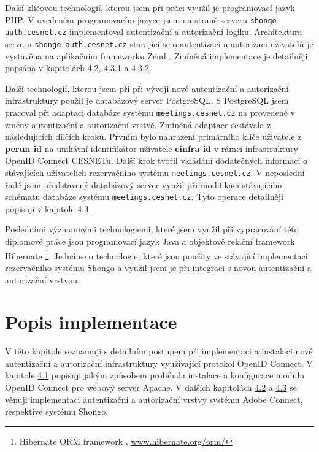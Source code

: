 \documentclass[
  printed, %
  twoside, %
  table,   %
  nolof,     %
  nolot,     %
]{fithesis3}
\begin{document}
\par
Další klíčovou technologií, kterou jsem při práci využil je programovací jazyk PHP. V uvedeném programovacím jazyce jsem na straně serveru \texttt{shongo-auth.cesnet.cz} implementoval autentizační a autorizační logiku. Architektura serveru \texttt{shongo-auth.cesnet.cz} starající se o autentizaci a autorizaci uživatelů je vystavěna na aplikačním frameworku Zend \cite{zend}. Zmíněná implementace je detailněji popsána v kapitolách \hyperref[ACImpl]{4.2}, \hyperref[ShongoImpl-authn]{4.3.1} a \hyperref[ShongoImpl-authr]{4.3.2}. 

\par

Další technologií, kterou jsem při při vývoji nové autentizační a autorizační infrastruktury použil je databázový server PostgreSQL. S PostgreSQL jsem pracoval při adaptaci databáze systému \texttt{meetings.cesnet.cz} na provedené v změny autentizační a autorizační vrstvě. Zmíněná adaptace sestávala z následujících dílčích kroků. Prvním bylo nahrazení primárního klíče uživatele z \textbf{perun id} na unikátní identifikátor uživatele  \textbf{einfra id} v rámci infrastruktury OpenID Connect CESNETu. Další krok tvořil vkládání dodatečných informací o stávajících uživatelích rezervačního systému \texttt{meetings.cesnet.cz}. V neposlední řadě jsem představený databázový server využil při modifikaci stávajícího schématu databáze systému \texttt{meetings.cesnet.cz}. Tyto operace detailněji popisuji v kapitole \hyperref[ShongoImpl]{4.3}. 
\par 
Posledními významnými technologiemi, které jsem využil při vypracování této diplomové práce jsou programovací jazyk Java a objektově relační framework Hibernate \footnote{Hibernate ORM framework , \url{www.hibernate.org/orm/}}. Jedná se o technologie, které jsou použity ve stávající implementaci rezervačního systému Shongo a využil jsem je při integraci s novou autentizační a autorizační vrstvou.  


\chapter{Popis implementace}
V této kapitole seznamuji s detailním postupem při implementaci a instalaci nové autentizační a autorizační infrastruktury využívající protokol OpenID Connect. V kapitole \hyperref[apacheConfig]{4.1} popisuji jakým způsobem probíhala instalace a konfigurace modulu OpenID Connect pro webový server Apache. V dalších kapitolách \hyperref[ACImpl]{4.2} a \hyperref[ShongoImpl]{4.3} se věnuji implementaci autentizační a autorizační vrstvy systému Adobe Connect, respektive systému Shongo.   
\end{document}

